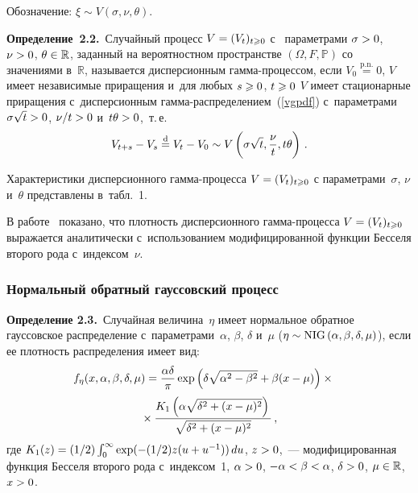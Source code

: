 \begin{multicols}{2}
        Обозначение: $\xi \sim V(\sigma, \nu, \theta)$.

\smallskip

\noindent
\textbf{Определение~2.2.}\
        Случайный  процесс  $V \hm= (V_t)_{t \hm\geqslant 0} $  с~ параметрами        
$\sigma\hm >0$, $\nu \hm> 0$, $\theta \hm\in \mathbb{R} $, заданный на вероятностном 
пространстве $ (\Omega, F, \mathbb{P}) $ со
        значениями в~$ \mathbb{R}$, называется дисперсионным гам\-ма-про\-цес\-сом, 
если $V_0\overset{\mathrm{p.n.}}{=} 0$, $V$ имеет независимые приращения и~для любых 
$s \hm\geqslant 0$, $t \hm\geqslant 0$ 
$V$ имеет стационарные приращения с~дисперсионным 
гам\-ма-рас\-пре\-де\-ле\-ни\-ем~(\ref{vgpdf}) с~параметрами $\sigma \sqrt{t}\hm > 0$, 
$\nu/t \hm> 0$ и~$t \theta\hm > 0$,~т.\,е.\
$$
V_{t+s} - V_s \overset{\mathrm{d}}{=} V_t - V_0 \sim 
V\left(\sigma \sqrt{t}, \displaystyle\frac{\displaystyle \nu\mathstrut}{\displaystyle t\mathstrut}, t \theta\right) \,.
$$

\smallskip

        Характеристики дисперсионного гам\-ма-про\-цес\-са $V \hm= (V_t)_{t \geqslant 0}$ 
с параметрами~$\sigma$, $\nu$ и~$\theta$ представлены в~табл.~1.


       
        В работе~\cite{madancarr} показано, что плотность дисперсионного 
        гамма-процесса  $V \hm= (V_t)_{t \geqslant 0}$ выражается аналитически с~использованием 
модифицированной функции Бесселя второго рода с~индексом~$\nu$.

        \subsubsection {Нормальный обратный гауссовский процесс}

\noindent
\textbf{Определение 2.3.}\  Случайная величина~$\eta$ имеет 
нормальное обратное гауссовское распределение с~параметрами~$\alpha$, $\beta$, 
$\delta$ и~$\mu$ ($\eta \hm\sim \mathrm{NIG}\,(\alpha, \beta, \delta, \mu)$), если ее плотность 
распределения имеет вид:
                \begin{multline*} 
                   \hspace*{-3mm}f_\eta(x, \alpha, \beta, \delta, \mu) = \fr{\alpha 
\delta}{\pi} \exp \left(\delta \sqrt{\alpha^2 - \beta^2} + \beta (x - \mu)\right) 
\times{}\\
{}\times \fr{K_1\left(\alpha \sqrt{\delta^2 + (x - \mu)^2}\right)}{\sqrt{\delta ^2 + (x - 
\mu)^2}}\,,
                \end{multline*}
                где $K_1(z) = (1/2) \int\nolimits_{0}^{\infty} \exp 
                (-({1}/{2}) z (u \hm+ u^{-1}))\,du$, $z\hm>0$,~--- 
                модифицированная функция Бесселя 
второго рода с~индексом~1, $\alpha \hm> 0$, $-\alpha \hm< \beta \hm< \alpha$, 
$\delta \hm> 0$,  $\mu \hm\in  \mathbb{R}$, $x\hm>0$.


\end{multicols}
